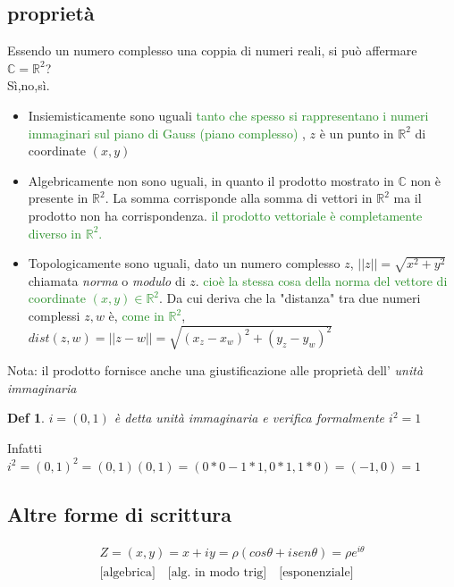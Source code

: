 \documentclass[a4paper]{article}
\newtheorem*{definition}{Def}
\newcommand{\appunto}[1]{\textcolor{ForestGreen}{#1}}
\newcommand{\R}[0]{\mathbb{R}}
\begin{document}
\subsection{proprietà}
Essendo un numero complesso una coppia di numeri reali, si può affermare $\mathbb{C} = \mathbb{R}^2$?\\
Sì,no,sì. 
\begin{itemize}
	\item Insiemisticamente sono uguali \appunto{tanto che spesso si rappresentano i numeri immaginari sul piano di Gauss (piano complesso)} , $z$ è un punto in $\R^2$ di coordinate $(x,y)$
	\item Algebricamente non sono uguali, in quanto il prodotto mostrato in $\mathbb{C}$ non è presente in $\mathbb{R}^2$.
La somma corrisponde alla somma di vettori in $\R^2$ ma il prodotto non ha corrispondenza.
\appunto{il prodotto vettoriale è  completamente diverso in $\mathbb{R}^2$.}
	\item Topologicamente sono uguali, dato un numero complesso $z$, $||z|| = \sqrt{x^2 + y^2}$ chiamata \textit{norma} o \textit{modulo} di $z$. \appunto{cioè la stessa cosa della norma del vettore di coordinate $(x,y) \in \R^2$}.
Da cui deriva che la "distanza" tra due numeri complessi $z,w$ è, \appunto{come in $\R^2$}, $dist(z,w)=||z-w|| = \sqrt{(x_z - x_w)^2 + (y_z - y_w)^2}$

\end{itemize}
Nota: il prodotto fornisce anche una giustificazione alle proprietà dell' \textit{unità immaginaria}
\begin{definition}
	$i=(0,1)$ è detta \textit{unità immaginaria} e verifica formalmente $i^2 =1$
\end{definition}
Infatti $i^2=(0,1)^2 = (0,1)(0,1) = (0*0 -1*1,0*1, 1 *0) = (-1,0) = 1$
\subsection{Altre forme di scrittura}
\begin{align*}
	Z=(x,y) = x+iy = \rho(cos\theta + i sen\theta)=\rho e^{i\theta}\\
	\text{[algebrica]}\quad \text{[alg. in modo trig]}\quad \text{[esponenziale]}
\end{align*}
\end{document}
